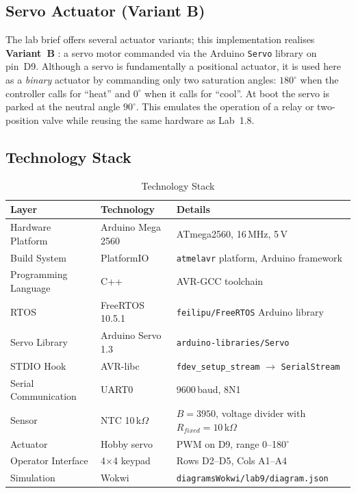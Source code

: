 \documentclass[12pt]{article}
\begin{document}
\subsection{Servo Actuator (Variant B)}

The lab brief offers several actuator variants; this implementation realises \textbf{Variant~B} \cite{labbrief}: a servo motor commanded via the Arduino \texttt{Servo} library on pin~D9. Although a servo is fundamentally a positional actuator, it is used here as a \emph{binary} actuator by commanding only two saturation angles: $180^{\circ}$ when the controller calls for \enquote{heat} and $0^{\circ}$ when it calls for \enquote{cool}. At boot the servo is parked at the neutral angle $90^{\circ}$. This emulates the operation of a relay or two-position valve while reusing the same hardware as Lab~1.8.

\subsection{Technology Stack}

\begin{table}[H]
\centering
\begin{tabular}{@{}lll@{}}
\toprule
\textbf{Layer} & \textbf{Technology} & \textbf{Details} \\
\midrule
Hardware Platform    & Arduino Mega 2560  & ATmega2560, 16\,MHz, 5\,V \\
Build System         & PlatformIO         & \texttt{atmelavr} platform, Arduino framework \\
Programming Language & C++                & AVR-GCC toolchain \\
RTOS                 & FreeRTOS 10.5.1    & \texttt{feilipu/FreeRTOS} Arduino library \\
Servo Library        & Arduino Servo 1.3  & \texttt{arduino-libraries/Servo} \\
STDIO Hook           & AVR-libc           & \texttt{fdev\_setup\_stream} $\to$ \texttt{SerialStream} \\
Serial Communication & UART0              & 9600\,baud, 8N1 \\
Sensor               & NTC 10\,k$\Omega$  & $B = 3950$, voltage divider with $R_{fixed} = 10$\,k$\Omega$ \\
Actuator             & Hobby servo        & PWM on D9, range 0--180$^{\circ}$ \\
Operator Interface   & 4$\times$4 keypad  & Rows D2--D5, Cols A1--A4 \\
Simulation           & Wokwi              & \texttt{diagramsWokwi/lab9/diagram.json} \\
\bottomrule
\end{tabular}
\caption{Technology Stack}
\label{tab:techstack}
\end{table}
\end{document}
